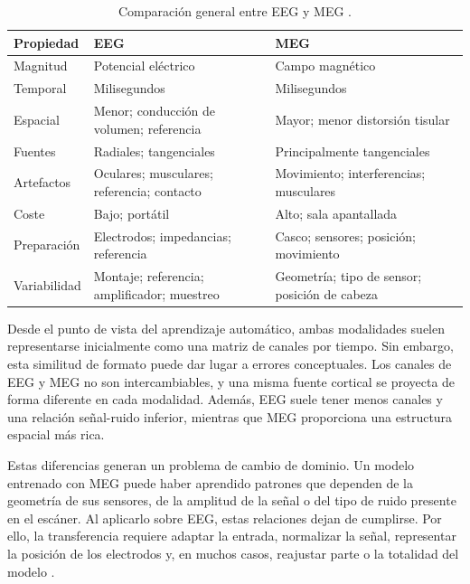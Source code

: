 \begin{table}[htbp]
\centering
\caption{Comparación general entre EEG y MEG \cite{hamalainen1993meg,gross2013meg}.}
\label{tab:eeg_meg_comparison}
\small
\setlength{\tabcolsep}{5pt}
\renewcommand{\arraystretch}{1.15}
\begin{tabularx}{\textwidth}{
    >{\raggedright\arraybackslash}p{2.4cm}
    >{\raggedright\arraybackslash}X
    >{\raggedright\arraybackslash}X
}
\toprule
\textbf{Propiedad} & \textbf{EEG} & \textbf{MEG} \\
\midrule
Magnitud & Potencial eléctrico & Campo magnético \\
Temporal & Milisegundos & Milisegundos \\
Espacial & Menor; conducción de volumen; referencia & Mayor; menor distorsión tisular \\
Fuentes & Radiales; tangenciales & Principalmente tangenciales \\
Artefactos & Oculares; musculares; referencia; contacto & Movimiento; interferencias; musculares \\
Coste & Bajo; portátil & Alto; sala apantallada \\
Preparación & Electrodos; impedancias; referencia & Casco; sensores; posición; movimiento \\
Variabilidad & Montaje; referencia; amplificador; muestreo & Geometría; tipo de sensor; posición de cabeza \\
\bottomrule
\end{tabularx}
\end{table}

Desde el punto de vista del aprendizaje automático, ambas modalidades suelen representarse inicialmente como una matriz de canales por tiempo. Sin embargo, esta similitud de formato puede dar lugar a errores conceptuales. Los canales de EEG y MEG no son intercambiables, y una misma fuente cortical se proyecta de forma diferente en cada modalidad. Además, EEG suele tener menos canales y una relación señal-ruido inferior, mientras que MEG proporciona una estructura espacial más rica.

Estas diferencias generan un problema de cambio de dominio. Un modelo entrenado con MEG puede haber aprendido patrones que dependen de la geometría de sus sensores, de la amplitud de la señal o del tipo de ruido presente en el escáner. Al aplicarlo sobre EEG, estas relaciones dejan de cumplirse. Por ello, la transferencia requiere adaptar la entrada, normalizar la señal, representar la posición de los electrodos y, en muchos casos, reajustar parte o la totalidad del modelo \cite{pan2010transfer,xiao2025brainomni}.

